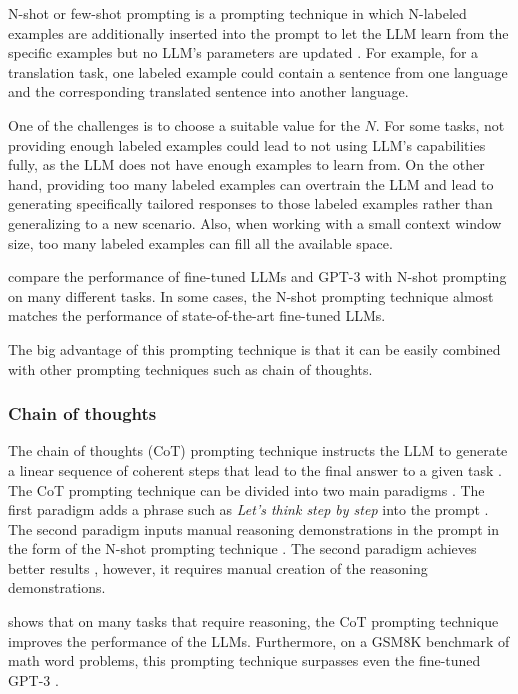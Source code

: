 N-shot or few-shot prompting is a prompting technique in which N-labeled examples are additionally inserted into the prompt to let the LLM learn from the specific examples but no LLM's parameters are updated \cite{Brown2020}. For example, for a translation task, one labeled example could contain a sentence from one language and the corresponding translated sentence into another language.

One of the challenges is to choose a suitable value for the $N$. For some tasks, not providing enough labeled examples could lead to not using LLM's capabilities fully, as the LLM does not have enough examples to learn from. On the other hand, providing too many labeled examples can overtrain the LLM and lead to generating specifically tailored responses to those labeled examples rather than generalizing to a new scenario. Also, when working with a small context window size, too many labeled examples can fill all the available space.

\citet{Brown2020} compare the performance of fine-tuned LLMs and GPT-3 with N-shot prompting on many different tasks. In some cases, the N-shot prompting technique almost matches the performance of state-of-the-art fine-tuned LLMs.

The big advantage of this prompting technique is that it can be easily combined with other prompting techniques such as chain of thoughts.


\subsubsection{Chain of thoughts}
\label{sec:chain_of_thoughts}

The chain of thoughts (CoT) prompting technique instructs the LLM to generate a linear sequence of coherent steps that lead to the final answer to a given task \cite{Wei2022}. The CoT prompting technique can be divided into two main paradigms \cite{Zhang2022}. The first paradigm adds a phrase such as \textit{Let's think step by step} into the prompt \cite{Kojima2022}. The second paradigm inputs manual reasoning demonstrations in the prompt in the form of the N-shot prompting technique \cite{Wei2022}. 
The second paradigm achieves better results \cite{Wei2022}, however, it requires manual creation of the reasoning demonstrations.

\citet{Wei2022} shows that on many tasks that require reasoning, the CoT prompting technique improves the performance of the LLMs. Furthermore, on a GSM8K benchmark of math word problems, this prompting technique surpasses even the fine-tuned GPT-3 \cite{Wei2022}.

